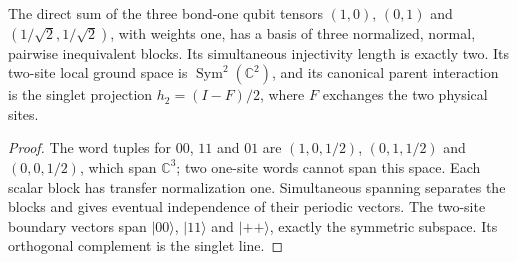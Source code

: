 \begin{lemma}
    \label{lem:three_normal_blocks_singlet_parent}
    \leanok
    The direct sum of the three bond-one qubit tensors
    $(1,0)$, $(0,1)$ and $(1/\sqrt2,1/\sqrt2)$, with weights one,
    has a basis of three normalized, normal, pairwise inequivalent blocks.
    Its simultaneous injectivity length is exactly two. Its two-site
    local ground space is $\operatorname{Sym}^2(\mathbb C^2)$, and its
    canonical parent interaction is the singlet projection
    $h_2=(I-F)/2$, where $F$ exchanges the two physical sites.
\end{lemma}

\begin{proof}
    \leanok
    The word tuples for $00$, $11$ and $01$ are
    $(1,0,1/2)$, $(0,1,1/2)$ and $(0,0,1/2)$, which span
    $\mathbb C^3$; two one-site words cannot span this space.
    Each scalar block has transfer normalization one. Simultaneous
    spanning separates the blocks and gives eventual independence of
    their periodic vectors. The two-site boundary vectors span
    $|00\rangle$, $|11\rangle$ and $|++\rangle$, exactly the symmetric
    subspace. Its orthogonal complement is the singlet line.
\end{proof}

